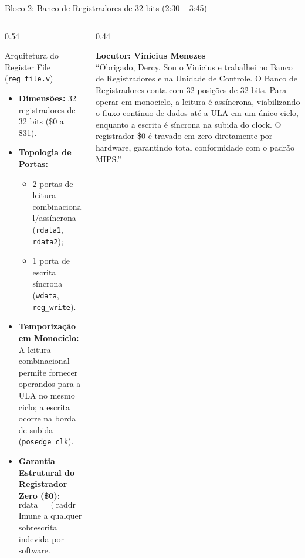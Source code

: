 \documentclass[aspectratio=169, 10pt]{beamer}
\begin{document}
\begin{frame}{Bloco 2: Banco de Registradores de 32 bits (2:30 -- 3:45)}
  \begin{columns}[T]
    \begin{column}{0.54\textwidth}
      \begin{block}{Arquitetura do Register File (\texttt{reg\_file.v})}
        \footnotesize
        \begin{itemize}\setlength{\itemsep}{1pt}
          \item \textbf{Dimensões:} 32 registradores de 32 bits (\$0 a \$31).
          \item \textbf{Topologia de Portas:}
            \begin{itemize}
              \item 2 portas de leitura combinacional/assíncrona (\texttt{rdata1}, \texttt{rdata2});
              \item 1 porta de escrita síncrona (\texttt{wdata}, \texttt{reg\_write}).
            \end{itemize}
          \item \textbf{Temporização em Monociclo:}
            A leitura combinacional permite fornecer operandos para a ULA no mesmo ciclo; a escrita ocorre na borda de subida (\texttt{posedge clk}).
          \item \textbf{Garantia Estrutural do Registrador Zero (\$0):}
            $$\text{rdata} = (\text{raddr} == 5\text{'b}0) \ ? \ 32\text{'b}0 : \text{registers}[\text{raddr}]$$
            Imune a qualquer sobrescrita indevida por software.
        \end{itemize}
      \end{block}
    \end{column}

    \begin{column}{0.44\textwidth}
      \begin{tcolorbox}[speakerbox]
        \textbf{Locutor: Vinicius Menezes}\\
        \vspace{1mm}
        \scriptsize
        ``Obrigado, Dercy. Sou o Vinicius e trabalhei no Banco de Registradores e na Unidade de Controle.
        O Banco de Registradores conta com 32 posições de 32 bits.
        Para operar em monociclo, a leitura é assíncrona, viabilizando o fluxo contínuo de dados até a ULA em um único ciclo, enquanto a escrita é síncrona na subida do clock.
        O registrador \$0 é travado em zero diretamente por hardware, garantindo total conformidade com o padrão MIPS.''
      \end{tcolorbox}
    \end{column}
  \end{columns}
\end{frame}
\end{document}
